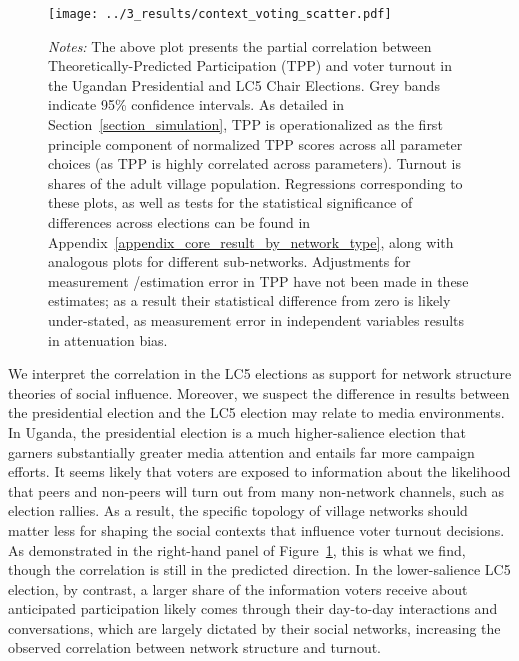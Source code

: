 \documentclass[12pt]{article}
\begin{document}
\vspace*{-0.1cm}
\begin{figure}
	\begin{center}
	    \caption{}\label{figure_social_context_scatter}
    		\texttt{[image: ../3\_results/context\_voting\_scatter.pdf]}
    \end{center}
	\scriptsize{\emph{Notes:}  The above plot presents the partial correlation between Theoretically-Predicted Participation (TPP) and voter turnout in the Ugandan Presidential and LC5 Chair Elections.  Grey bands indicate 95\% confidence intervals.  As detailed in Section~\ref{section_simulation}, TPP is operationalized as the first principle component of normalized TPP scores across all parameter choices (as TPP is highly correlated across parameters). Turnout is shares of the adult village population. Regressions corresponding to these plots, as well as tests for the statistical significance of differences across elections can be found in Appendix~\ref{appendix_core_result_by_network_type}, along with analogous plots for different sub-networks. Adjustments for measurement /estimation error in TPP have not been made in these estimates; as a result their statistical difference from zero is likely under-stated, as measurement error in independent variables results in attenuation bias.}
\end{figure}

We interpret the correlation in the LC5 elections as support for network structure theories of social influence. Moreover, we suspect the difference in results between the presidential election and the LC5 election may relate to media environments. In Uganda, the presidential election is a much higher-salience election that garners substantially greater media attention and entails far more campaign efforts. It seems likely that voters are exposed to information about the likelihood that peers and non-peers will turn out from many non-network channels, such as election rallies. As a result, the specific topology of village networks should matter less for shaping the social contexts that influence voter turnout decisions.  As demonstrated in the right-hand panel of Figure~\ref{figure_social_context_scatter}, this is what we find, though the correlation is still in the predicted direction. In the lower-salience LC5 election, by contrast, a larger share of the information voters receive about anticipated participation likely comes through their day-to-day interactions and conversations, which are largely dictated by their social networks, increasing the observed correlation between network structure and turnout.
\end{document}
